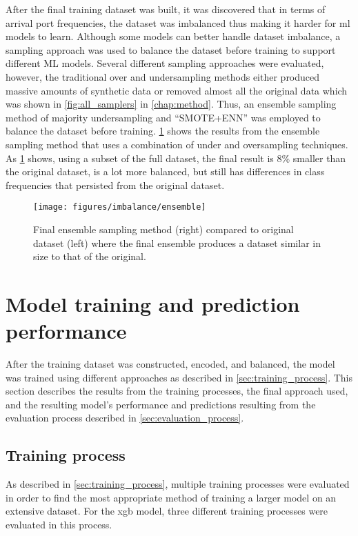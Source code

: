 After the final training dataset was built, it was discovered that in terms of arrival port frequencies, the dataset was imbalanced thus making it harder for \acrshort{ml} models to learn. Although some models can better handle dataset imbalance, a sampling approach was used to balance the dataset before training to support different ML models. Several different sampling approaches were evaluated, however, the traditional over and undersampling methods either produced massive amounts of synthetic data or removed almost all the original data which was shown in \cref{fig:all_samplers} in \cref{chap:method}. Thus, an ensemble sampling method of majority undersampling and ``SMOTE+ENN'' was employed to balance the dataset before training. \cref{fig:ensemble_sampler} shows the results from the ensemble sampling method that uses a combination of under and oversampling techniques. As \cref{fig:ensemble_sampler} shows, using a subset of the full dataset, the final result is 8\% smaller than the original dataset, is a lot more balanced, but still has differences in class frequencies that persisted from the original dataset.

\begin{figure}[htbp]
    \centering
    \texttt{[image: figures/imbalance/ensemble]}
    \caption{Final ensemble sampling method (right) compared to original dataset (left) where the final ensemble produces a dataset similar in size to that of the original.}
    \label{fig:ensemble_sampler}
\end{figure}

\section{Model training and prediction performance}

After the training dataset was constructed, encoded, and balanced, the model was trained using different approaches as described in \cref{sec:training_process}. This section describes the results from the training processes, the final approach used, and the resulting model's performance and predictions resulting from the evaluation process described in \cref{sec:evaluation_process}.

\subsection{Training process}

As described in \cref{sec:training_process}, multiple training processes were evaluated in order to find the most appropriate method of training a larger model on an extensive dataset. For the \acrfull{xgb} model, three different training processes were evaluated in this process.

